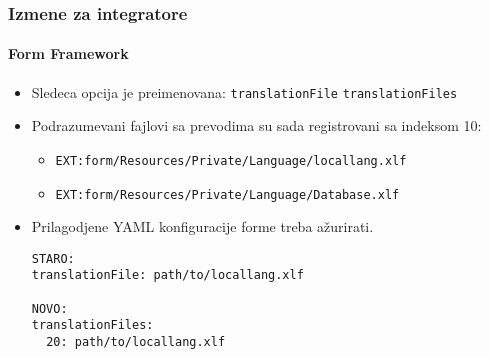 \begin{frame}[fragile]
	\frametitle{Izmene za integratore}
	\framesubtitle{Form Framework}

	\lstset{basicstyle=\tiny\ttfamily}

	\begin{itemize}
		\item Sledeca opcija je preimenovana:\newline
			\small\texttt{translationFile} \textrightarrow\hspace{0.1cm}\texttt{translationFiles}\normalsize
		\item Podrazumevani fajlovi sa prevodima su sada registrovani sa indeksom 10:

			\begin{itemize}
				\item \texttt{EXT:form/Resources/Private/Language/locallang.xlf}
				\item \texttt{EXT:form/Resources/Private/Language/Database.xlf}
			\end{itemize}

		\item Prilagodjene YAML konfiguracije forme treba ažurirati.

\begin{lstlisting}
STARO:
translationFile: path/to/locallang.xlf

NOVO:
translationFiles:
  20: path/to/locallang.xlf
\end{lstlisting}

	\end{itemize}

\end{frame}


